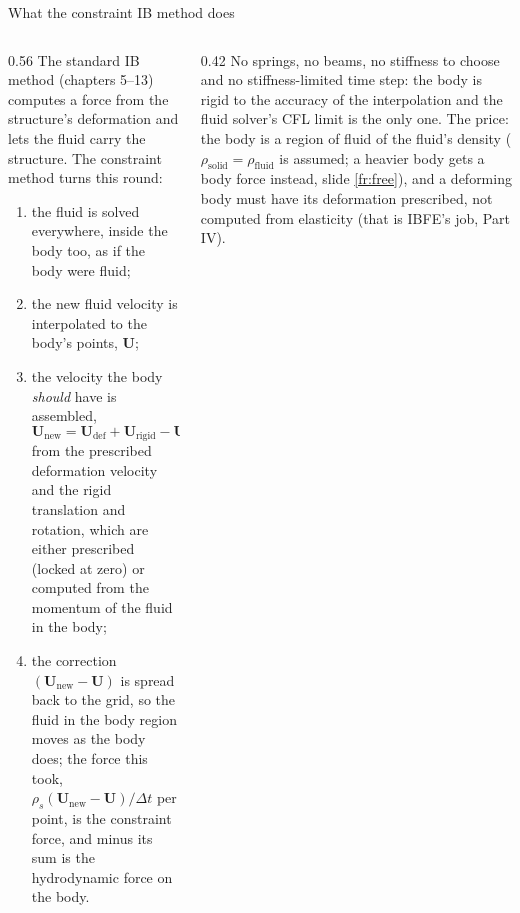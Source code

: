 \documentclass[aspectratio=169,11pt]{beamer}
\begin{document}
\begin{frame}{What the constraint IB method does}
\label{fr:what}
\begin{columns}[T,onlytextwidth]
\begin{column}{0.56\textwidth}
\scriptsize The standard IB method (chapters 5--13) computes a force from the structure's deformation and lets the fluid carry the structure. The constraint method turns this round:
\begin{enumerate}
  \item the fluid is solved everywhere, inside the body too, as if the body were fluid;
  \item the new fluid velocity is interpolated to the body's points, $\mathbf{U}$;
  \item the velocity the body \emph{should} have is assembled,
  \[\mathbf{U}_{\mathrm{new}} = \mathbf{U}_{\mathrm{def}} + \mathbf{U}_{\mathrm{rigid}} - \mathbf{U}_{\mathrm{def,COM}} + \boldsymbol{\Omega}\times\mathbf{R},\]
  from the prescribed deformation velocity and the rigid translation and rotation, which are either prescribed (locked at zero) or computed from the momentum of the fluid in the body;
  \item the correction $(\mathbf{U}_{\mathrm{new}} - \mathbf{U})$ is spread back to the grid, so the fluid in the body region moves as the body does; the force this took, $\rho_s(\mathbf{U}_{\mathrm{new}} - \mathbf{U})/\Delta t$ per point, is the constraint force, and minus its sum is the hydrodynamic force on the body.
\end{enumerate}
\end{column}
\begin{column}{0.42\textwidth}
\scriptsize No springs, no beams, no stiffness to choose and no stiffness-limited time step: the body is rigid to the accuracy of the interpolation and the fluid solver's CFL limit is the only one. The price: the body is a region of fluid of the fluid's density ($\rho_{\mathrm{solid}} = \rho_{\mathrm{fluid}}$ is assumed; a heavier body gets a body force instead, slide \ref{fr:free}), and a deforming body must have its deformation prescribed, not computed from elasticity (that is IBFE's job, Part IV).
\end{column}
\end{columns}
\end{frame}
\end{document}
